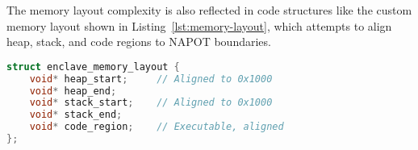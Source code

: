 





The memory layout complexity is also reflected in code structures like the custom memory layout shown in Listing~\ref{lst:memory-layout}, which attempts to align heap, stack, and code regions to NAPOT boundaries.

\begin{lstlisting}[language=C, caption={Custom memory layout aligned to NAPOT for enclave use.}, label={lst:memory-layout}]
struct enclave_memory_layout {
    void* heap_start;     // Aligned to 0x1000
    void* heap_end;
    void* stack_start;    // Aligned to 0x1000
    void* stack_end;
    void* code_region;    // Executable, aligned
};
\end{lstlisting}


